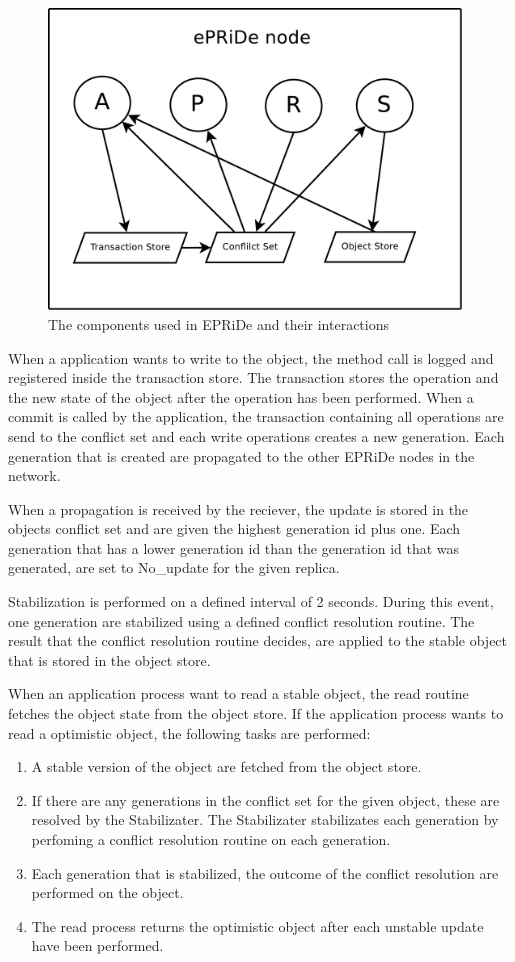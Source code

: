 \begin{figure}[htb]
\centerline{\includegraphics[height=8cm]{components.pdf}}
\caption{The components used in EPRiDe and their interactions}\label{fig:components}
\end{figure}


When a application wants to write to the object, the method call is logged and registered inside the transaction store. The transaction stores the operation and the new state of the object after the operation has been performed. When a commit is called by the application, the transaction containing all operations are send to the conflict set and each write operations creates a new generation. Each generation that is created are propagated to the other EPRiDe nodes in the network. 

When a propagation is received by the reciever, the update is stored in the objects conflict set and are given the highest generation id plus one. Each generation that has a lower generation id than the generation id that was generated, are set to No\_update for the given replica. 

Stabilization is performed on a defined interval of 2 seconds. During this event, one generation are stabilized using a defined conflict resolution routine. The result that the conflict resolution routine decides, are applied to the stable object that is stored in the object store.
  


When an application process want to read a stable object, the read routine fetches the object state from the object store. If the application process wants to read a optimistic object, the following tasks are performed: 
\begin{enumerate}
	\item A stable version of the object are fetched from the object store.
	\item If there are any generations in the conflict set for the given object, these are resolved by the Stabilizater. The Stabilizater stabilizates each generation by perfoming a conflict resolution routine on each generation. 
	\item Each generation that is stabilized, the outcome of the conflict resolution are performed on the object. 
	\item The read process returns the optimistic object after each unstable update have been performed.
\end{enumerate}

